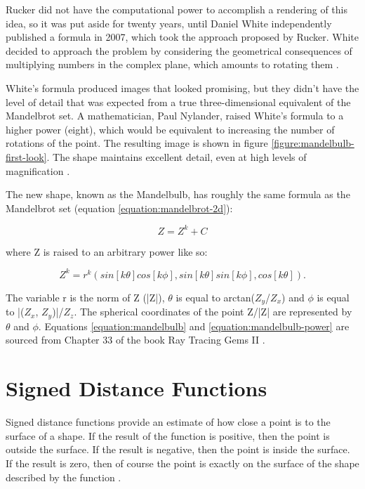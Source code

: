 Rucker did not have the computational power to accomplish a rendering of this idea, so it was put aside for twenty years, until Daniel White independently published a formula in 2007, which took the approach proposed by Rucker. White decided to approach the problem by considering the geometrical consequences of multiplying numbers in the complex plane, which amounts to rotating them \cite{aron2009mandelbulb}.\newline

White's formula produced images that looked promising, but they didn't have the level of detail that was expected from a true three-dimensional equivalent of the Mandelbrot set. A mathematician, Paul Nylander, raised White's formula to a higher power (eight), which would be equivalent to increasing the number of rotations of the point. The resulting image is shown in figure \ref{figure:mandelbulb-first-look}. The shape maintains excellent detail, even at high levels of magnification \cite {aron2009mandelbulb}.

\newpage

The new shape, known as the Mandelbulb, has roughly the same formula as the Mandelbrot set (equation \ref{equation:mandelbrot-2d}):

\begin{equation} \label{equation:mandelbulb}
	Z = {Z^k} + C
\end{equation}

where Z is raised to an arbitrary power like so:

\begin{equation} \label{equation:mandelbulb-power}
	{Z^k} = {r^k}(sin[k\theta]cos[k\phi], sin[k\theta]sin[k\phi], cos[k\theta]).
\end{equation}

The variable r is the norm of Z (|Z|), $\theta$ is equal to arctan($Z_y$/$Z_x$) and $\phi$ is equal to |($Z_x$, $Z_y$)|/$Z_z$. The spherical coordinates of the point Z/|Z| are represented by $\theta$ and $\phi$. Equations \ref{equation:mandelbulb} and \ref{equation:mandelbulb-power} are sourced from Chapter 33 of the book Ray Tracing Gems II \cite{marrs2021ray}.

\section{Signed Distance Functions}

Signed distance functions provide an estimate of how close a point is to the surface of a shape. If the result of the function is positive, then the point is outside the surface. If the result is negative, then the point is inside the surface. If the result is zero, then of course the point is exactly on the surface of the shape described by the function \cite{roblesprocedural}.\newline

